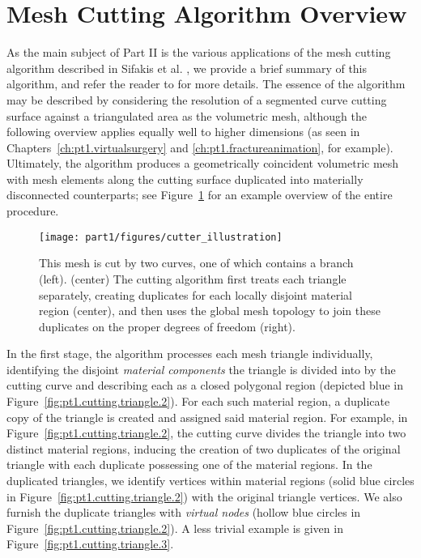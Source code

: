\section*{Mesh Cutting Algorithm Overview}

As the main subject of Part II is the various applications of the mesh cutting algorithm described in Sifakis et al. \cite{Sifakis07}, we provide a brief summary of this algorithm, and refer the reader to \cite{Sifakis07} for more details. The essence of the algorithm may be described by considering the resolution of a segmented curve cutting surface against a triangulated area as the volumetric mesh, although the following overview applies equally well to higher dimensions (as seen in Chapters~\ref{ch:pt1.virtualsurgery} and \ref{ch:pt1.fractureanimation}, for example). Ultimately, the algorithm produces a geometrically coincident volumetric mesh with mesh elements along the cutting surface duplicated into materially disconnected counterparts; see Figure~\ref{fig:pt1.cutting.example} for an example overview of the entire procedure.

\setlength{\figurewidth}{\columnwidth}
\begin{figure}[htbp]
\begin{center}
\texttt{[image: part1/figures/cutter\_illustration]}
\caption{This mesh is cut by two curves, one of which contains a branch (left). (center) The cutting algorithm first treats each triangle separately, creating duplicates for each locally disjoint material region (center), and then uses the global mesh topology to join these duplicates on the proper degrees of freedom (right). }
\label{fig:pt1.cutting.example}
\end{center}
\end{figure}

In the first stage, the algorithm processes each mesh triangle individually, identifying the disjoint \emph{material components} the triangle is divided into by the cutting curve and describing each as a closed polygonal region (depicted blue in Figure~\ref{fig:pt1.cutting.triangle.2}). For each such material region, a duplicate copy of the triangle is created and assigned said material region. For example, in Figure~\ref{fig:pt1.cutting.triangle.2}, the cutting curve divides the triangle into two distinct material regions, inducing the creation of two duplicates of the original triangle with each duplicate possessing one of the material regions. In the duplicated triangles, we identify vertices within material regions (solid blue circles in Figure~\ref{fig:pt1.cutting.triangle.2}) with the original triangle vertices. We also furnish the duplicate triangles with \emph{virtual nodes} (hollow blue circles in Figure~\ref{fig:pt1.cutting.triangle.2}). A less trivial example is given in Figure~\ref{fig:pt1.cutting.triangle.3}.

